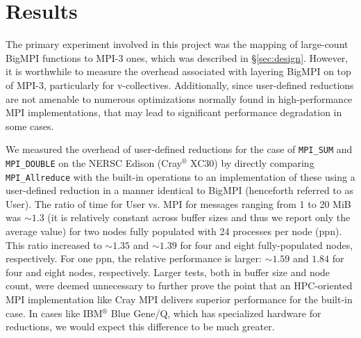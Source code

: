 
\section{Results}

The primary experiment involved in this project was the
mapping of large-count BigMPI functions to MPI-3 ones,
which was described in \S\ref{sec:design}.
However, it is worthwhile to measure the overhead associated
with layering BigMPI on top of MPI-3, particularly for v-collectives.
Additionally, since user-defined reductions are not amenable to numerous
optimizations normally found in high-performance MPI implementations,
that may lead to significant performance degradation in some cases.


We measured the overhead of user-defined reductions for the case
of \texttt{MPI\_SUM} and \texttt{MPI\_DOUBLE} on the NERSC Edison
(Cray${}^\circledR$ XC30) by directly comparing \texttt{MPI\_Allreduce}
with the built-in operations to an implementation of these using a user-defined
reduction in a manner identical to BigMPI (henceforth referred to as User).
The ratio of time for User vs. MPI for messages ranging from 1 to 20 MiB
was $\sim1.3$ (it is relatively constant across buffer sizes and thus we
report only the average value) for two nodes fully populated with
24 processes per node (ppn).  This ratio increased to $\sim1.35$ and $\sim1.39$
for four and eight fully-populated nodes, respectively.  For one ppn, the relative
performance is larger: $\sim1.59$ and $1.84$ for four and eight nodes, respectively.
Larger tests, both in buffer size and node count, were deemed unnecessary to further
prove the point that an HPC-oriented MPI implementation like Cray MPI delivers
superior performance for the built-in case.
In cases like IBM${}^\circledR$ Blue Gene/Q, which has specialized hardware
for reductions, we would expect this difference to be much greater.

